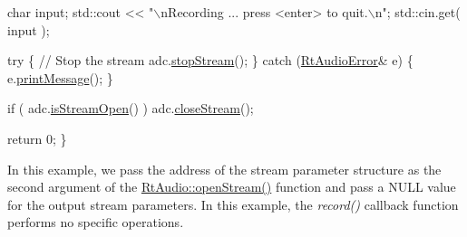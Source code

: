 \begin{DoxyCode}
  \textcolor{keywordtype}{char} input;
  std::cout << \textcolor{stringliteral}{"\(\backslash\)nRecording ... press <enter> to quit.\(\backslash\)n"};
  std::cin.get( input );

  \textcolor{keywordflow}{try} \{
    \textcolor{comment}{// Stop the stream}
    adc.\hyperlink{class_rt_audio_af4c241ff86936ecc8108f0d9dfe3efdd}{stopStream}();
  \}
  \textcolor{keywordflow}{catch} (\hyperlink{class_rt_audio_error}{RtAudioError}& e) \{
    e.\hyperlink{class_rt_audio_error_a0124bb90075cf3201865a0ea9b43a826}{printMessage}();
  \}

  \textcolor{keywordflow}{if} ( adc.\hyperlink{class_rt_audio_a3863e45ff81dbe97176de0ee7545917f}{isStreamOpen}() ) adc.\hyperlink{class_rt_audio_a90d599002ad32cf250a4cb866f2cc93a}{closeStream}();

  \textcolor{keywordflow}{return} 0;
\}
\end{DoxyCode}


In this example, we pass the address of the stream parameter structure as the second argument of the \hyperlink{class_rt_audio_a6907539d2527775df778ebce32ef1e3b}{Rt\+Audio\+::open\+Stream()} function and pass a N\+U\+LL value for the output stream parameters. In this example, the {\itshape record()} callback function performs no specific operations. 